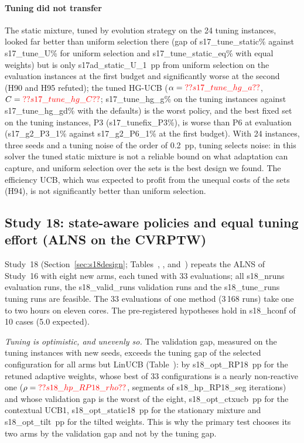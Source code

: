 \paragraph{Tuning did not transfer} The static mixture, tuned by evolution strategy on the 24 tuning instances, looked far better than uniform selection there (gap of \num{s17_tune_static}\% against \num{s17_tune_U}\% for uniform selection and \num{s17_tune_static_eq}\% with equal weights) but is only \num{s17ad_static_U_1}~pp from uniform selection on the evaluation instances at the first budget and significantly worse at the second (H90 and H95 refuted); the tuned HG-UCB ($\alpha=\num{s17_tune_hg_a}$, $C=\num{s17_tune_hg_C}$; \num{s17_tune_hg_g}\% on the tuning instances against \num{s17_tune_hg_gd}\% with the defaults) is the worst policy, and the best fixed set on the tuning instances, P3 (\num{s17_tunefix_P3}\%), is worse than P6 at evaluation (\num{s17_g2_P3_1}\% against \num{s17_g2_P6_1}\% at the first budget). With 24 instances, three seeds and a tuning noise of the order of 0.2~pp, tuning selects noise: in this solver the tuned static mixture is not a reliable bound on what adaptation can capture, and uniform selection over the sets is the best design we found. The efficiency UCB, which was expected to profit from the unequal costs of the sets (H94), is not significantly better than uniform selection.

\subsection{Study 18: state-aware policies and equal tuning effort (ALNS on the CVRPTW)}\label{sec:s18}
Study~18 (Section~\ref{sec:s18design}; Tables~, ,  and~) repeats the ALNS of Study~16 with eight new arms, each tuned with 33 evaluations; all \num{s18_nruns} evaluation runs, the \num{s18_valid_runs} validation runs and the \num{s18_tune_runs} tuning runs are feasible. The 33 evaluations of one method (3\,168 runs) take one to two hours on eleven cores. The pre-registered hypotheses hold in \num{s18_hconf} of 10 cases (5.0 expected).

\emph{Tuning is optimistic, and unevenly so.} The validation gap, measured on the tuning instances with new seeds, exceeds the tuning gap of the selected configuration for all arms but LinUCB (Table~): by \num{s18_opt_RP18}~pp for the retuned adaptive weights, whose best of 33 configurations is a nearly non-reactive one ($\rho=\num{s18_hp_RP18_rho}$, segments of \num{s18_hp_RP18_seg} iterations) and whose validation gap is the worst of the eight, \num{s18_opt_ctxucb}~pp for the contextual UCB1, \num{s18_opt_static18}~pp for the stationary mixture and \num{s18_opt_tilt}~pp for the tilted weights. This is why the primary test chooses its two arms by the validation gap and not by the tuning gap.

